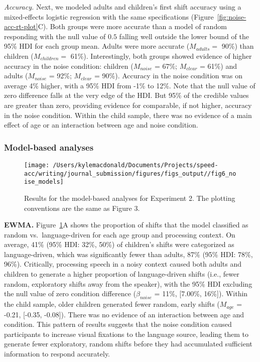 \documentclass[,man,floatsintext]{apa6}
\begin{document}
\emph{Accuracy.} Next, we modeled adults and children's first shift
accuracy using a mixed-effects logistic regression with the same
specifications (Figure~\ref{fig:noise-acc-rt-plot}C). Both groups were
more accurate than a model of random responding with the null value of
\(0.5\) falling well outside the lower bound of the 95\% HDI for each
group mean. Adults were more accurate (\(M_{adults} =\) 90\%) than
children (\(M_{children} =\) 61\%). Interestingly, both groups showed
evidence of higher accuracy in the noise condition: children
(\(M_{noise}\) = 67\%; \(M_{clear}\) = 61\%) and adults (\(M_{noise}\) =
92\%; \(M_{clear}\) = 90\%). Accuracy in the noise condition was on
average 4\% higher, with a 95\% HDI from -1\% to 12\%. Note that the
null value of zero difference falls at the very edge of the HDI. But
95\% of the credible values are greater than zero, providing evidence
for comparable, if not higher, accuracy in the noise condition. Within
the child sample, there was no evidence of a main effect of age or an
interaction between age and noise condition.

\subsubsection{Model-based analyses}\label{model-based-analyses-1}

\begin{figure}[!t]

{\centering \texttt{[image: /Users/kylemacdonald/Documents/Projects/speed-acc/writing/journal\_submission/figures/figs\_output//fig6\_noise\_models]} 

}

\caption{Results for the model-based analyses for Experiment 2. The plotting conventions are the same as Figure 3.}\label{fig:noise-model-plots}
\end{figure}

\textbf{EWMA.} Figure~\ref{fig:noise-model-plots}A shows the proportion
of shifts that the model classified as random vs.~language-driven for
each age group and processing context. On average, 41\% (95\% HDI: 32\%,
50\%) of children's shifts were categorized as language-driven, which
was significantly fewer than adults, 87\% (95\% HDI: 78\%, 96\%).
Critically, processing speech in a noisy context caused both adults and
children to generate a higher proportion of language-driven shifts
(i.e., fewer random, exploratory shifts away from the speaker), with the
95\% HDI excluding the null value of zero condition difference
(\(\beta_{noise}\) = 11\%, {[}7.00\%, 16\%{]}). Within the child sample,
older children generated fewer random, early shifts (\(M_{age}\) =
-0.21, {[}-0.35, -0.08{]}). There was no evidence of an interaction
between age and condition. This pattern of results suggests that the
noise condition caused participants to increase visual fixations to the
language source, leading them to generate fewer exploratory, random
shifts before they had accumulated sufficient information to respond
accurately.
\end{document}
